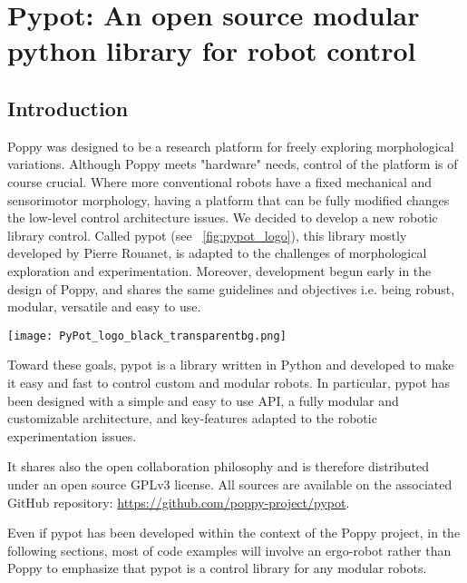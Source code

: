 
\cleartoleftpage

\chapter{Pypot: An open source modular python library for robot control} %

\section{Introduction} %

Poppy was designed to be a research platform for freely exploring morphological variations. Although Poppy meets "hardware" needs, control of the platform is of course crucial. Where more conventional robots have a fixed mechanical and sensorimotor morphology, having a platform that can be fully modified changes the low-level control architecture issues.
We decided to develop a new robotic library control. Called pypot (see \figurename~\ref{fig:pypot_logo}), this library mostly developed by Pierre Rouanet, is adapted to the challenges of morphological exploration and experimentation. Moreover, development begun early in the design of Poppy, and shares the same guidelines and objectives i.e. being robust, modular, versatile and easy to use.


\begin{NFfigure}
    \centering
        \texttt{[image: PyPot\_logo\_black\_transparentbg.png]}
    \caption{}
    \label{fig:pypot_logo}
\end{NFfigure}

Toward these goals, pypot is a library written in Python and developed to make it easy and fast to control custom and modular robots. In particular, pypot has been designed with a simple and easy to use API, a fully modular and customizable architecture, and key-features adapted to the robotic experimentation issues.

It shares also the open collaboration philosophy and is therefore distributed under an open source GPLv3 license. All sources are available on the associated GitHub repository: \url{https://github.com/poppy-project/pypot}.

Even if pypot has been developed within the context of the Poppy project, in the following sections, most of code examples will involve an ergo-robot rather than Poppy to emphasize that pypot is a control library for any modular robots.



